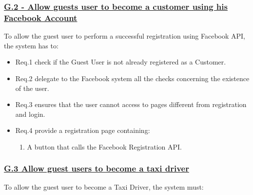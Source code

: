 \documentclass{report}
\begin{document}
			\subsubsection{\lbrack \hyperref[sec:g2]{G.2 - Allow guests user to become a customer using his Facebook Account}\rbrack}
			To allow the guest user to perform a successful registration using Facebook API, the system has to:

				\begin{itemize}
					\item \lbrack Req.1\rbrack \label{sec:fr1_g2} check if the Guest User is not already registered as a Customer.
					\item \lbrack Req.2\rbrack \label{sec:fr2_g2} delegate to the Facebook system all the checks concerning the existence of the user.
					\item \lbrack Req.3\rbrack \label{sec:fr3_g2} ensures that the user cannot access to pages different from registration and login.
 					\item \lbrack Req.4\rbrack \label{sec:fr4_g2} provide a registration page containing:
						\begin{enumerate}
							\item A button that calls the Facebook Registration API.
						\end{enumerate}
				\end{itemize}

			\subsubsection{\lbrack \hyperref[sec:g3]{G.3 Allow guest users to become a taxi driver}\rbrack}
			To allow the guest user to become a Taxi Driver, the system must:

\end{document}
